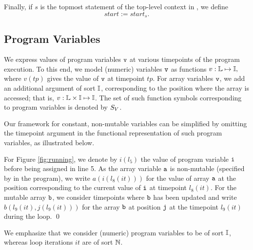 Finally, if $s$ is the topmost statement of the top-level context in , we define $$\mathit{start} := \mathit{start}_s.$$

\subsection{Program Variables}\label{sec:prgVars}
We express values of program variables $\texttt{v}$ at various timepoints
of the program execution. To this end, we model
(numeric) variables $\texttt{v}$ as functions 
$v: \mathbb{L} \mapsto \mathbb{I},$
where $v(tp)$ gives the value of $\texttt{v}$ at timepoint $tp$.
%
For array variables $\texttt{v}$,
we add an additional argument of sort $\mathbb{I}$, corresponding to
the position where the array is accessed; that is, 
$ v: \mathbb{L} \times \mathbb{I} \mapsto \mathbb{I}$.
%
The set of such function symbols corresponding to program variables is
denoted by $S_V$. %

Our framework for constant, non-mutable variables can be simplified by
omitting the timepoint argument in the functional representation of 
such program variables, as illustrated below.%

\begin{example}\label{ex:prgVars}
	For Figure \ref{fig:running}, we denote by $i(l_5)$ the value of program variable 
	$\texttt{i}$ before being assigned in line 5. 
	As the array variable $\texttt{a}$ is non-mutable (specified by  in the program), we write $a(i(l_{8}(it)))$ for 
	the value of array $\texttt{a}$ at the position corresponding to the current value of $\texttt{i}$ at timepoint $l_{8}(it)$.
	For the  mutable array $\texttt{b}$, we consider timepoints where
	$\texttt{b}$ has been updated and write $b(l_{9}(it),
	j(l_{9}(it)))$ for the array $\texttt{b}$ at position $\texttt{j}$ at the
	timepoint $l_{9}(it)$ during the loop.
	\qed
\end{example}


We emphasize that we consider (numeric) program variables  to be of sort
$\mathbb{I}$, whereas loop iterations $it$ are of sort  $\mathbb{N}$. 
%
